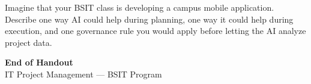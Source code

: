 \documentclass[11pt,a4paper]{article}
\begin{document}
\begin{examplebox}
Imagine that your BSIT class is developing a campus mobile application. Describe one way AI could help during planning, one way it could help during execution, and one governance rule you would apply before letting the AI analyze project data.
\end{examplebox}

\vfill
\begin{center}
{\large\textcolor{primary}{\textbf{End of Handout}}}\\[4pt]
{\small\textcolor{gray!70!black}{IT Project Management --- BSIT Program}}
\end{center}
\end{document}
